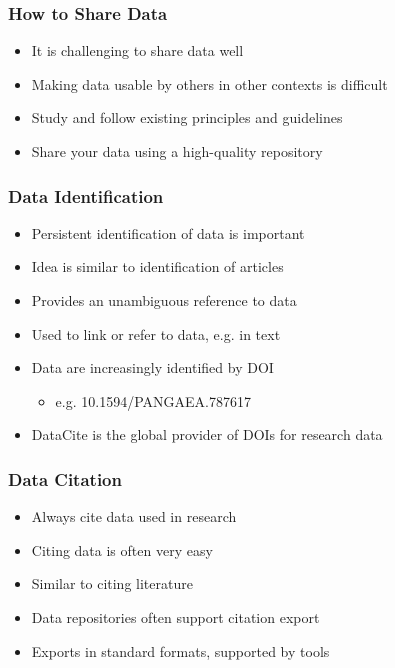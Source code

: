 \documentclass{beamer}
\begin{document}
\begin{frame}
  \frametitle{How to Share Data}
  
  \begin{itemize}
  \item It is challenging to share data well
  \item Making data usable by others in other contexts is difficult
  \item Study and follow existing principles and guidelines
  \item Share your data using a high-quality repository
  \end{itemize}
\end{frame}

\begin{frame}
  \frametitle{Data Identification}
  
  \begin{itemize}
  \item Persistent identification of data is important
  \item Idea is similar to identification of articles
  \item Provides an unambiguous reference to data
  \item Used to link or refer to data, e.g. in text
  \item Data are increasingly identified by DOI 
  \begin{itemize}
  \item e.g. 10.1594/PANGAEA.787617
  \end{itemize}
  \item DataCite is the global provider of DOIs for research data
  \end{itemize}
\end{frame}

\begin{frame}
  \frametitle{Data Citation}
  
  \begin{itemize}
  \item Always cite data used in research
  \item Citing data is often very easy
  \item Similar to citing literature
  \item Data repositories often support citation export
  \item Exports in standard formats, supported by tools
  \end{itemize}
\end{frame}
\end{document}
